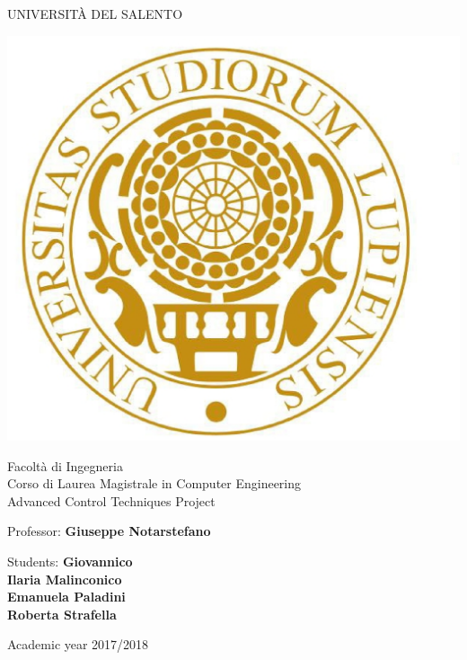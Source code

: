 \thispagestyle{empty}                                                 
\begin{center}                                                            
    \vspace{5mm}                                                           
 {\LARGE UNIVERSIT\`A DEL SALENTO} \\                       
      \vspace{5mm}
\end{center}
\begin{center}
{\includegraphics[scale=.20]{figs/logo_unisalento}}      
\end{center}
\begin{center}
      \vspace{5mm}
      {\LARGE Facolt\`a di Ingegneria} \\
        \vspace{3mm}
      {\Large Corso di Laurea Magistrale in Computer Engineering} \\
      \vspace{20mm}
      {\LARGE Advanced Control Techniques Project} \\
      \vspace{15mm}
\end{center}
\begin{flushleft}                                                                              
     {\large Professor: \textbf{\@ Giuseppe Notarstefano}} \\        
      \vspace{13mm}
\end{flushleft}
\begin{flushright}
      {\large Students: \textbf{\@Danilo Giovannico\\Ilaria Malinconico\\Emanuela Paladini\\Roberta Strafella}}\\
\end{flushright}        %
\begin{center}
\vfill
      {\large Academic year \@2017/2018} \\
\end{center}
